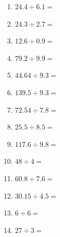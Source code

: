 \documentclass[12pt]{article}
\begin{document}
\begin{enumerate}
\item \large $ 24.4 \div 6.1 = $ \vspace{1.5cm}
\item \large $ 24.3 \div 2.7 = $ \vspace{1.5cm}
\item \large $ 12.6 \div 0.9 = $ \vspace{1.5cm}
\item \large $ 79.2 \div 9.9 = $ \vspace{1.5cm}
\newpage
\item \large $ 44.64 \div 9.3 = $ \vspace{1.5cm}
\item \large $ 139.5 \div 9.3 = $ \vspace{1.5cm}
\item \large $ 72.54 \div 7.8 = $ \vspace{1.5cm}
\item \large $ 25.5 \div 8.5 = $ \vspace{1.5cm}
\item \large $ 117.6 \div 9.8 = $ \vspace{1.5cm}
\item \large $ 48 \div 4 = $ \vspace{1.5cm}
\item \large $ 60.8 \div 7.6 = $ \vspace{1.5cm}
\item \large $ 30.15 \div 4.5 = $ \vspace{1.5cm}
\item \large $ 6 \div 6 = $ \vspace{1.5cm}
\item \large $ 27 \div 3 = $ \vspace{1.5cm}
\end{enumerate}\newpage
\end{document}
